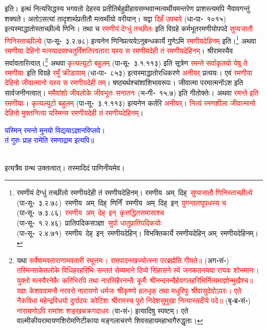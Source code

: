 \begin{sloppypar}\justifying\noindent इति। इत्थं नित्य\-सिद्धस्य भगवतो देहस्य प्रतीतिर्बहु\-व्रीहावसम्भवान्मत्वर्थीयमन्तरेण प्राशस्त्यमपि नैवावगन्तुं शक्यते। अतोऽसत्यां तादृशार्थ\-प्रतीतौ मत्वर्थीयो वरीयान्। यद्वा \textcolor{red}{दिहँ उपचये} (धा॰पा॰~१०१५) इत्यस्माद्धातोस्ताच्छील्ये णिनिः। तथा च \textcolor{red}{रमणीयं देग्धुं तच्छीलः} इति विग्रहे कर्म\-भूत\-रमणीयोपपदे \textcolor{red}{सुप्यजातौ णिनिस्ताच्छील्ये} (पा॰सू॰~३.२.७८) इत्यनेन णिनि\-प्रत्ययेऽनुबन्ध\-कार्ये गुणेऽमि \textcolor{red}{रमणीय\-देहिनम्‌} इति।\footnote{रमणीयं देग्धुं तच्छीलो रमणीय\-देही तं रमणीय\-देहिनम्। रमणीय~अम्~दिह्~\arrow \textcolor{red}{सुप्यजातौ णिनिस्ताच्छील्ये} (पा॰सू॰~३.२.७८)~\arrow रमणीय~अम्~दिह्~णिनिँ~\arrow रमणीय~अम्~दिह्~इन्~\arrow \textcolor{red}{पुगन्त\-लघूपधस्य च} (पा॰सू॰~७.३.८६)~\arrow \textcolor{red}{रमणीय~अम्~देह्~इन्‌}~\arrow \textcolor{red}{कृत्तद्धित\-समासाश्च} (पा॰सू॰~१.२.४६)~\arrow प्रातिपदिक\-सञ्ज्ञा~\arrow \textcolor{red}{सुपो धातु\-प्रातिपदिकयोः} (पा॰सू॰~२.४.७१)~\arrow रमणीय~देह्~इन्~\arrow रमणीयदेहिन्। विभक्तिकार्ये रमणीयदेहिन् अम्~\arrow रमणीयदेहिनम्।} अथवा \textcolor{red}{रमणीया देहिनो मत्स्यादयश्चतुर्विंशतिरवतारा यस्य स रमणीय\-देही तं रमणीय\-देहिनम्‌}। श्रीरामस्यैव सर्वावतारित्वात्।\footnote{यथा \textcolor{red}{सर्वेषामवताराणामवतारी रघूत्तमः। रामपादनखज्योत्स्ना परब्रह्मेति गीयते॥} (अग॰सं॰) \textcolor{red}{तस्मिन्साकेतलोके विधिहरहरिभिः सन्ततं सेव्यमाने दिव्ये सिंहासने स्वे जनकतनयया राघवः शोभमानः। युक्तो मत्स्यैरनेकैः करिभिरपि तथा नारसिंहैरनन्तैः कूर्मैः श्रीनन्दनन्दैर्हयगलहरिभिर्नित्यमाज्ञोन्मुखैश्च॥ यज्ञः केशववामनौ नरवरो नारायणो धर्मजः श्रीकृष्णो हलधृक् तथा मधुरिपुः श्रीवासुदेवोऽपरः। एते नैकविधा महेन्द्रविधयो दुर्गादयः कोटिशः श्रीरामस्य पुरो निदेशसुमुखा नित्यास्तदीये पदे॥} (बृ॰ब्र॰सं॰) \textcolor{red}{नारायणोऽपि रामांशः शङ्खचक्रगदाधरः} (वा॰सं॰) इत्यादिषु स्पष्टम्। एते वाल्मीकीय\-रामायण\-शिरोमणि\-टीकाया मङ्गलाचरणे शिवसहाय\-महाभागैरुद्धृताः।} अथवा \textcolor{red}{कृत्य\-ल्युटो बहुलम्‌} (पा॰सू॰~३.१.११३) इति सूत्रेण \textcolor{red}{रमन्ते सर्वाकृतयो येषु ते रमणीयाः} इति विग्रहे \textcolor{red}{रमुँ क्रीडायाम्‌} (धा॰पा॰~८५३) इत्यस्माद्धातोरधिकरणे \textcolor{red}{अनीयर्‌} प्रत्ययः। एवं \textcolor{red}{रमणीया देहिनो जीवात्मानो यस्य स रमणीयदेही तम्‌}। षष्ठ्यर्थश्चांशांशि\-भाव\-रूपः। जीवात्मा परमात्मनोंऽश इति सार्वजनीनत्वात्। \textcolor{red}{ममैवांशो जीव\-लोके जीवभूतः सनातनः} (भ॰गी॰~१५.७) इति गीतोक्तेः। अथवा \textcolor{red}{रमन्ते इति रमणीयाः}। \textcolor{red}{कृत्य\-ल्युटो बहुलम्‌} (पा॰सू॰~३.१.११३) इत्यनेन कर्तरि \textcolor{red}{अनीयर्‌}। \textcolor{red}{नित्यं रमणशीला जीवात्मानो देहिनो मुक्त\-नित्या यस्मिन्स रमणीय\-देही तं रमणीय\-देहिनम्‌}।\end{sloppypar}
\centering\textcolor{blue}{यस्मिन् रमन्ते मुनयो विद्ययाऽज्ञानविप्लवे।\nopagebreak\\
तं गुरुः प्राह रामेति रमणाद्राम इत्यपि॥}\nopagebreak\\
\\
\begin{sloppypar}\justifying\noindent इत्यत्रैव ग्रन्थ उक्तत्वात्। तस्मादिदं पाणिनीयमेव।\end{sloppypar}

